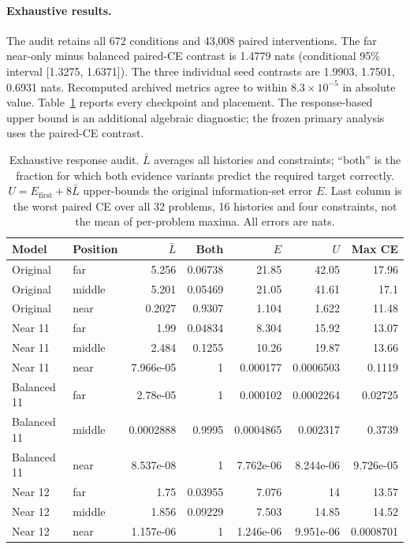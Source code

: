 \paragraph{Exhaustive results.}
The audit retains all 672 conditions and 43,008 paired interventions. The far near-only minus balanced paired-CE contrast is 1.4779 nats (conditional 95\% interval [1.3275, 1.6371]).
The three individual seed contrasts are 1.9903, 1.7501, 0.6931 nats.
Recomputed archived metrics agree to within $8.3\times10^{-5}$ in absolute value.
Table~\ref{tab:history-response} reports every checkpoint and placement. The response-based upper bound is an additional algebraic diagnostic; the frozen primary analysis uses the paired-CE contrast.
\begin{table}[t]
\centering\small
\caption{Exhaustive response audit. $\bar L$ averages all histories and constraints; ``both'' is the fraction for which both evidence variants predict the required target correctly. $U=E_{\mathrm{first}}+8\bar L$ upper-bounds the original information-set error $E$. Last column is the worst paired CE over all 32 problems, 16 histories and four constraints, not the mean of per-problem maxima. All errors are nats.}
\label{tab:history-response}
\begin{tabular}{llrrrrr}
\toprule
Model & Position & $\bar L$ & Both & $E$ & $U$ & Max CE\\
\midrule
Original & far & 5.256 & 0.06738 & 21.85 & 42.05 & 17.96\\
Original & middle & 5.201 & 0.05469 & 21.05 & 41.61 & 17.1\\
Original & near & 0.2027 & 0.9307 & 1.104 & 1.622 & 11.48\\
Near 11 & far & 1.99 & 0.04834 & 8.304 & 15.92 & 13.07\\
Near 11 & middle & 2.484 & 0.1255 & 10.26 & 19.87 & 13.66\\
Near 11 & near & 7.966e-05 & 1 & 0.000177 & 0.0006503 & 0.1119\\
Balanced 11 & far & 2.78e-05 & 1 & 0.000102 & 0.0002264 & 0.02725\\
Balanced 11 & middle & 0.0002888 & 0.9995 & 0.0004865 & 0.002317 & 0.3739\\
Balanced 11 & near & 8.537e-08 & 1 & 7.762e-06 & 8.244e-06 & 9.726e-05\\
Near 12 & far & 1.75 & 0.03955 & 7.076 & 14 & 13.57\\
Near 12 & middle & 1.856 & 0.09229 & 7.503 & 14.85 & 14.52\\
Near 12 & near & 1.157e-06 & 1 & 1.246e-06 & 9.951e-06 & 0.0008701\\

\end{tabular}
\end{table}
